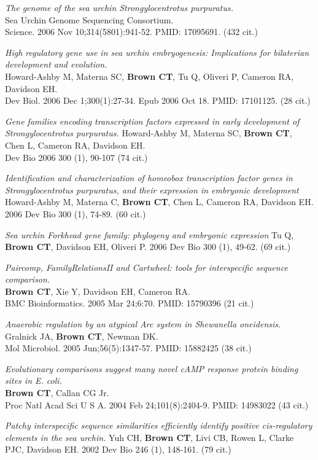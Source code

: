 \documentclass[margin,line]{resume}
\begin{document}
\begin{resume}
{\em The genome of the sea urchin Strongylocentrotus purpuratus.}\\
Sea Urchin Genome Sequencing Consortium.\\
Science. 2006 Nov 10;314(5801):941-52.
PMID: 17095691.  (432 cit.)

{\em High regulatory gene use in sea urchin embryogenesis: Implications for bilaterian development and evolution.}\\
Howard-Ashby M, Materna SC, {\bf Brown CT}, Tu Q, Oliveri P, Cameron RA, Davidson EH.\\
Dev Biol. 2006 Dec 1;300(1):27-34. Epub 2006 Oct 18.
PMID: 17101125.  (28 cit.)

{\em Gene families encoding transcription factors expressed in early development of Strongylocentrotus purpuratus.}
Howard-Ashby M, Materna SC, {\bf Brown CT}, Chen L, Cameron RA, Davidson EH.\\
Dev Bio 2006 300 (1), 90-107 (74 cit.)

{\em Identification and characterization of homeobox transcription factor genes in Strongylocentrotus purpuratus, and their expression in embryonic development}
Howard-Ashby M, Materna C, {\bf Brown CT}, Chen L, Cameron RA, Davidson EH.
2006 Dev Bio 300 (1), 74-89.  (60 cit.)

{\em Sea urchin Forkhead gene family: phylogeny and embryonic expression}
Tu Q, {\bf Brown CT}, Davidson EH, Oliveri P.
2006 Dev Bio 300 (1), 49-62. (69 cit.)

{\em Paircomp, FamilyRelationsII and Cartwheel: tools for interspecific sequence comparison.}\\
{\bf Brown CT}, Xie Y, Davidson EH, Cameron RA.\\
BMC Bioinformatics. 2005 Mar 24;6:70.
PMID: 15790396 (21 cit.)

{\em Anaerobic regulation by an
atypical Arc system in {\em Shewanella oneidensis}.}\\
Gralnick JA, {\bf Brown CT}, Newman DK.\\
Mol Microbiol. 2005
Jun;56(5):1347-57.  PMID: 15882425 (38 cit.)

\newpage

{\em Evolutionary comparisons suggest
many novel cAMP response protein binding sites in {\em E. coli}.}\\
{\bf Brown CT}, Callan CG Jr.\\
Proc Natl Acad Sci U S A. 2004 Feb 24;101(8):2404-9.  PMID: 14983022 (43 cit.)

{\em Patchy interspecific sequence similarities efficiently identify positive cis-regulatory elements in the sea urchin.}
Yuh CH, {\bf Brown CT}, Livi CB, Rowen L, Clarke PJC, Davidson EH.
2002 Dev Bio 246 (1), 148-161. (79 cit.)


\end{resume}
\end{document}
